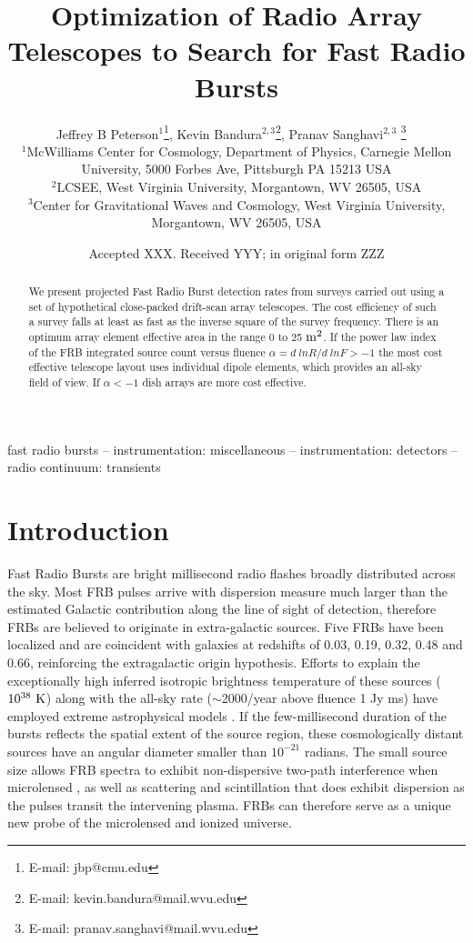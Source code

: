\documentclass[fleqn,usenatbib]{mnras}
\title{Optimization of Radio Array Telescopes to Search for Fast Radio Bursts}
\author[Peterson J. B. et. al.]{
Jeffrey B Peterson$^{1}$\thanks{E-mail: jbp@cmu.edu },
Kevin Bandura$^{2,3}$\thanks{E-mail: kevin.bandura@mail.wvu.edu },
Pranav Sanghavi$^{2,3}$ \thanks{E-mail: pranav.sanghavi@mail.wvu.edu}
\
\\
$^{1}$McWilliams Center for Cosmology, Department of Physics, Carnegie Mellon University, 5000 Forbes Ave, Pittsburgh PA 15213 USA\\
$^{2}$LCSEE, West Virginia University, Morgantown, WV 26505, USA\\
$^{3}$Center for Gravitational Waves and Cosmology, West Virginia University, Morgantown, WV 26505, USA
}
\date{Accepted XXX. Received YYY; in original form ZZZ}
\begin{document}
\label{firstpage}
\pagerange{\pageref{firstpage}--\pageref{lastpage}}
\maketitle

\begin{abstract}
We present projected Fast Radio Burst detection rates from surveys carried out using a set of hypothetical close-packed drift-scan array telescopes. The cost efficiency of such a survey falls at least as fast as the inverse square of the survey frequency. There is an optimum array element effective area in the range 0 to 25 $\rm{m^2}$.  If the power law index of the FRB integrated source count versus fluence $\alpha = d ~ln R/d ~ln F > -1$ the most cost effective telescope layout uses individual dipole elements, which provides an all-sky field of view. If $\alpha <-1$ dish arrays are more cost effective.

\end{abstract}

\begin{keywords}
fast radio bursts -- instrumentation: miscellaneous -- instrumentation: detectors -- radio continuum: transients 
\end{keywords}

\section{Introduction}
Fast Radio Bursts are bright millisecond radio flashes broadly distributed across the sky. Most FRB pulses arrive with dispersion measure much larger than the estimated Galactic contribution along the line of sight of detection, therefore FRBs are believed to originate in extra-galactic sources.
Five FRBs \citep{2017ApJ...834L...7T,frbcat} have been localized and are coincident with galaxies at redshifts of 0.03, 0.19, 0.32, 0.48 and 0.66, reinforcing the extragalactic origin hypothesis.
Efforts to explain the exceptionally high inferred isotropic brightness temperature of these sources ($10^{38} \rm{~K}$) along with the all-sky rate ($\sim$2000/year above fluence 1 Jy ms) have employed extreme astrophysical models \citep{review1, review2}. If the few-millisecond duration of the bursts reflects the spatial extent of the source region, these cosmologically distant sources have an angular diameter smaller than $10^{-21}$ radians. The small source size allows FRB spectra to exhibit non-dispersive two-path interference when microlensed \citep{2019BAAS...51c.420R}, as well as scattering and scintillation that does exhibit dispersion as the pulses transit the intervening plasma. FRBs can therefore serve as a unique new probe of the microlensed and ionized universe.
\end{document}
